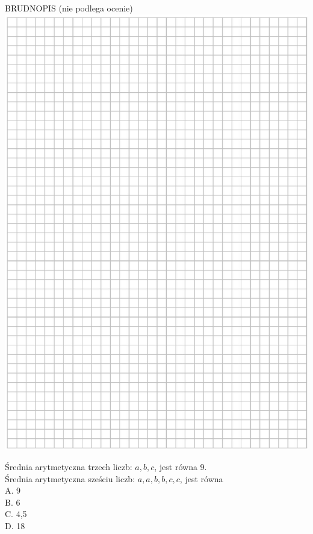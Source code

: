 \documentclass[10pt]{article}
\begin{document}
BRUDNOPIS (nie podlega ocenie)\\
\includegraphics[max width=\textwidth, center]{2024_11_21_0a35d272448d5080a489g-07}

Średnia arytmetyczna trzech liczb: \(a, b, c\), jest równa 9.\\
Średnia arytmetyczna sześciu liczb: \(a, a, b, b, c, c\), jest równa\\
A. 9\\
B. 6\\
C. 4,5\\
D. 18
\end{document}
